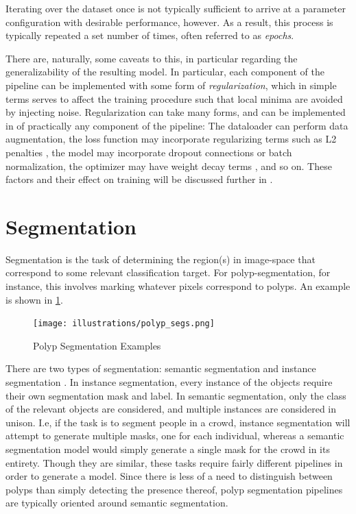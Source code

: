         Iterating over the dataset once is not typically sufficient to arrive at a parameter configuration with desirable performance, however. As a result, this process is typically repeated a set number of times, often referred to as \textit{epochs}. 
        
        There are, naturally, some caveats to this, in particular regarding the generalizability of the resulting model. In particular, each component of the pipeline can be implemented with some form of \textit{regularization}, which in simple terms serves to affect the training procedure such that local minima are avoided by injecting noise. Regularization can take many forms, and can be implemented in of practically any component of the pipeline: The dataloader can perform data augmentation, the loss function may incorporate regularizing terms such as L2 penalties \cite{l2_reg}, the model may incorporate dropout connections \cite{dropout} or batch normalization\cite{batchnorm}, the optimizer may have weight decay terms \cite{weight_decay}, and so on. These factors and their effect on training will be discussed further in . 

\section{Segmentation}
    Segmentation is the task of determining the region(s) in image-space that correspond to some relevant classification target. For polyp-segmentation, for instance, this involves marking whatever pixels correspond to polyps. An example is shown in \ref{fig:segmentation}. 
    \begin{figure}[ht]
        \centering
        \texttt{[image: illustrations/polyp\_segs.png]}
        \caption{Polyp Segmentation Examples}
        \label{fig:segmentation}
    \end{figure}
    
    There are two types of segmentation: semantic segmentation and instance segmentation \cite{segmentation_survey}. In instance segmentation, every instance of the objects require their own segmentation mask and label. In semantic segmentation, only the class of the relevant objects are considered, and multiple instances are considered in unison.  I.e, if the task is to segment people in a crowd, instance segmentation will attempt to generate multiple masks, one for each individual, whereas a semantic segmentation model would simply generate a single mask for the crowd in its entirety. Though they are similar, these tasks require fairly different pipelines in order to generate a model. Since there is less of a need to distinguish between polyps than simply detecting the presence thereof, polyp segmentation pipelines are typically oriented around semantic segmentation. 
    
